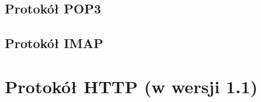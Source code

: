 \documentclass{article}
\begin{document}
\newpage
\subsection*{Protokół POP3}

\newpage 
\subsection*{Protokół IMAP}

\newpage 
\section{Protokół HTTP (w wersji 1.1)}



\newpage
\end{document}
